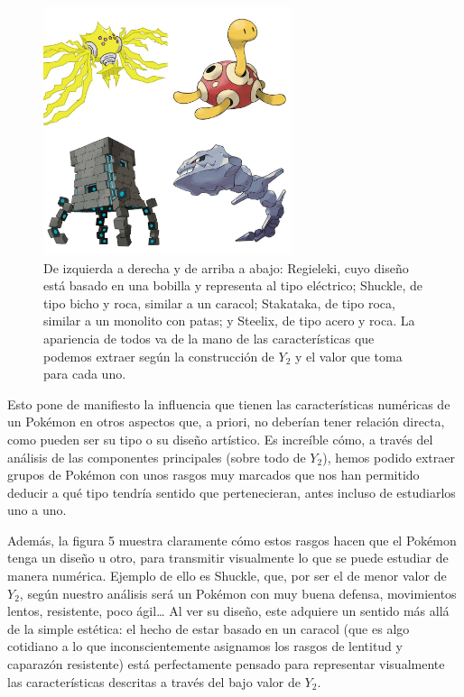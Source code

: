 \documentclass[
  11.8pt,
]{extreport}
\begin{document}
\begin{figure}[H]

{\centering \includegraphics[width=2.86458in,height=\textheight]{trabajo_images/pokemons.jpg}

}

\caption{De izquierda a derecha y de arriba a abajo: Regieleki, cuyo
diseño está basado en una bobilla y representa al tipo eléctrico;
Shuckle, de tipo bicho y roca, similar a un caracol; Stakataka, de tipo
roca, similar a un monolito con patas; y Steelix, de tipo acero y roca.
La apariencia de todos va de la mano de las características que podemos
extraer según la construcción de \(Y_2\) y el valor que toma para cada
uno.}

\end{figure}%

Esto pone de manifiesto la influencia que tienen las características
numéricas de un Pokémon en otros aspectos que, a priori, no deberían
tener relación directa, como pueden ser su tipo o su diseño artístico.
Es increíble cómo, a través del análisis de las componentes principales
(sobre todo de \(Y_2\)), hemos podido extraer grupos de Pokémon con unos
rasgos muy marcados que nos han permitido deducir a qué tipo tendría
sentido que pertenecieran, antes incluso de estudiarlos uno a uno.

Además, la figura 5 muestra claramente cómo estos rasgos hacen que el
Pokémon tenga un diseño u otro, para transmitir visualmente lo que se
puede estudiar de manera numérica. Ejemplo de ello es Shuckle, que, por
ser el de menor valor de \(Y_2\), según nuestro análisis será un Pokémon
con muy buena defensa, movimientos lentos, resistente, poco ágil\ldots{}
Al ver su diseño, este adquiere un sentido más allá de la simple
estética: el hecho de estar basado en un caracol (que es algo cotidiano
a lo que inconscientemente asignamos los rasgos de lentitud y caparazón
resistente) está perfectamente pensado para representar visualmente las
características descritas a través del bajo valor de \(Y_2\).
\end{document}
